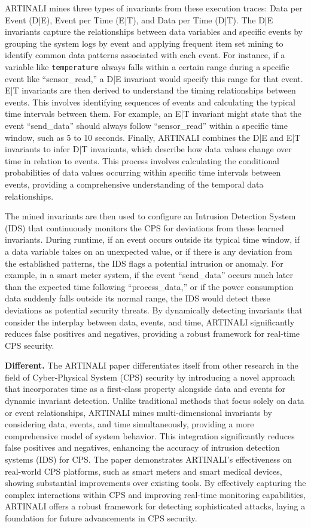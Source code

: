 ARTINALI mines three types of invariants from these execution traces: Data per Event (D|E), Event per Time (E|T), and Data per Time (D|T). The D|E invariants capture the relationships between data variables and specific events by grouping the system logs by event and applying frequent item set mining to identify common data patterns associated with each event. For instance, if a variable like \texttt{temperature} always falls within a certain range during a specific event like ``sensor\_read,'' a D|E invariant would specify this range for that event. E|T invariants are then derived to understand the timing relationships between events. This involves identifying sequences of events and calculating the typical time intervals between them. For example, an E|T invariant might state that the event ``send\_data'' should always follow ``sensor\_read'' within a specific time window, such as 5 to 10 seconds. Finally, ARTINALI combines the D|E and E|T invariants to infer D|T invariants, which describe how data values change over time in relation to events. This process involves calculating the conditional probabilities of data values occurring within specific time intervals between events, providing a comprehensive understanding of the temporal data relationships.

The mined invariants are then used to configure an Intrusion Detection System (IDS) that continuously monitors the CPS for deviations from these learned invariants. During runtime, if an event occurs outside its typical time window, if a data variable takes on an unexpected value, or if there is any deviation from the established patterns, the IDS flags a potential intrusion or anomaly. For example, in a smart meter system, if the event ``send\_data'' occurs much later than the expected time following ``process\_data,'' or if the power consumption data suddenly falls outside its normal range, the IDS would detect these deviations as potential security threats. By dynamically detecting invariants that consider the interplay between data, events, and time, ARTINALI significantly reduces false positives and negatives, providing a robust framework for real-time CPS security\cite{22}.

\textbf{Different. }The ARTINALI paper differentiates itself from other research in the field of Cyber-Physical System (CPS) security by introducing a novel approach that incorporates time as a first-class property alongside data and events for dynamic invariant detection. Unlike traditional methods that focus solely on data or event relationships, ARTINALI mines multi-dimensional invariants by considering data, events, and time simultaneously, providing a more comprehensive model of system behavior. This integration significantly reduces false positives and negatives, enhancing the accuracy of intrusion detection systems (IDS) for CPS. The paper demonstrates ARTINALI's effectiveness on real-world CPS platforms, such as smart meters and smart medical devices, showing substantial improvements over existing tools. By effectively capturing the complex interactions within CPS and improving real-time monitoring capabilities, ARTINALI offers a robust framework for detecting sophisticated attacks, laying a foundation for future advancements in CPS security.

